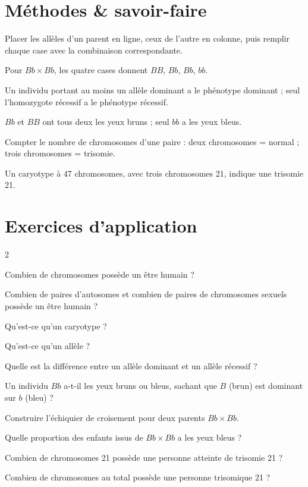 \section{Méthodes \& savoir-faire}

Placer les allèles d'un parent en ligne, ceux de l'autre en colonne, puis remplir chaque
case avec la combinaison correspondante.
\begin{exemple}
Pour $Bb\times Bb$, les quatre cases donnent $BB$, $Bb$, $Bb$, $bb$.
\end{exemple}

Un individu portant au moins un allèle dominant a le phénotype dominant ; seul
l'homozygote récessif a le phénotype récessif.
\begin{exemple}
$Bb$ et $BB$ ont tous deux les yeux bruns ; seul $bb$ a les yeux bleus.
\end{exemple}

Compter le nombre de chromosomes d'une paire : deux chromosomes = normal ; trois
chromosomes = trisomie.
\begin{exemple}
Un caryotype à $47$ chromosomes, avec trois chromosomes 21, indique une trisomie 21.
\end{exemple}

\section{Exercices d'application}
\begin{multicols}{2}

\exo{} Combien de chromosomes possède un être humain ?

\exo{} Combien de paires d'autosomes et combien de paires de chromosomes
sexuels possède un être humain ?

\exo{} Qu'est-ce qu'un caryotype ?

\exo{} Qu'est-ce qu'un allèle ?

\exo{} Quelle est la différence entre un allèle dominant et un allèle
récessif ?

\exo{} Un individu $Bb$ a-t-il les yeux bruns ou bleus, sachant que $B$ (brun)
est dominant sur $b$ (bleu) ?

\exo{} Construire l'échiquier de croisement pour deux parents $Bb\times Bb$.

\exo{} Quelle proportion des enfants issus de $Bb\times Bb$ a les yeux bleus ?

\exo{} Combien de chromosomes 21 possède une personne atteinte de trisomie 21 ?

\exo{} Combien de chromosomes au total possède une personne trisomique 21 ?

\end{multicols}

